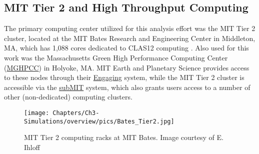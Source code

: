    


\subsection{MIT Tier 2 and High Throughput Computing}

    The primary computing center utilized for this analysis effort was the MIT Tier 2 cluster, located at the MIT Bates Research and Engineering Center in Middleton, MA, which has 1,088 cores dedicated to CLAS12 computing .  Also used for this work was the Massachusetts Green High Performance Computing Center (\href{https://www.mghpcc.org/}{MGHPCC}) in Holyoke, MA. MIT Earth and Planetary Science provides access to these nodes through their \href{https://engaging-ood.mit.edu/pun/sys/dashboard}{Engaging} system, while the MIT Tier 2 cluster is accessible via the \href{https://submit.mit.edu/}{subMIT} system, which also grants users access to a number of other (non-dedicated) computing clusters.

    




    \begin{figure}
        \centering
        \texttt{[image: Chapters/Ch3-Simulations/overview/pics/Bates\_Tier2.jpg]}
        \caption[MIT Tier 2]{MIT Tier 2 computing racks at MIT Bates. Image courtesy of E. Ihloff}
        \label{fig:BatesComputing}
    \end{figure}


    






